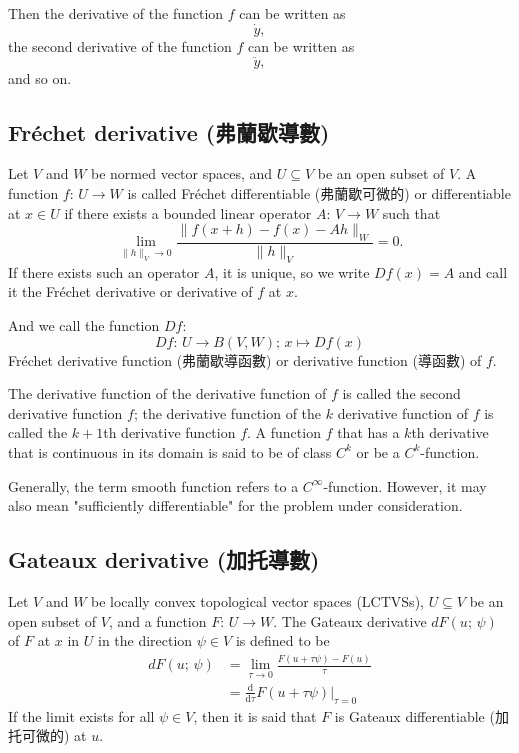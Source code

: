 \documentclass[a4paper,12pt]{report}
\begin{document}
Then the derivative of the function $f$ can be written as
\[\dot{y},\]
the second derivative of the function $f$ can be written as
\[\ddot{y},\]
and so on.
\subsection{Fréchet derivative (弗蘭歇導數)}
Let $V$ and $W$ be normed vector spaces, and $U\subseteq V$ be an open subset of $V$. A function $f:\,U\to W$ is called Fréchet differentiable (弗蘭歇可微的) or differentiable at $x\in U$ if there exists a bounded linear operator $A:\,V\to W$ such that
\[\lim_{\|h\|_V\to 0}\frac{\|f(x+h)-f(x)-Ah\|_W}{\|h\|_V}=0.\]
If there exists such an operator $A$, it is unique, so we write $Df(x)=A$ and call it the Fréchet derivative or derivative of $f$ at $x$.

And we call the function $Df$:
\[Df:\,U\to B(V,W);\,x\mapsto Df(x)\]
Fréchet derivative function (弗蘭歇導函數) or derivative function (導函數) of $f$.

The derivative function of the derivative function of $f$ is called the second derivative function $f$; the derivative function of the $k$ derivative function of $f$ is called the $k+1$th derivative function $f$.
A function $f$ that has a $k$th derivative that is continuous in its domain is said to be of class $C^k$ or be a $C^k$-function.

Generally, the term smooth function refers to a $C^{\infty}$-function. However, it may also mean "sufficiently differentiable" for the problem under consideration.
\subsection{Gateaux derivative (加托導數)}
Let $V$ and $W$ be locally convex topological vector spaces (LCTVSs), $U\subseteq V$ be an open subset of $V$, and a function $F:\,U\to W$. The Gateaux derivative $dF(u;\,\psi)$ of $F$ at $x$ in $U$ in the direction $\psi \in V$ is defined to be
\[\begin{aligned}
dF(u;\,\psi) &= \lim_{\tau\to 0}\frac{F(u+\tau \psi)-F(u)}{\tau}\\
&= \frac{\mathrm{d}}{\mathrm{d}\tau}F(u+\tau \psi)\big\vert_{\tau =0}
\end{aligned}\]
If the limit exists for all $\psi \in V$, then it is said that $F$ is Gateaux differentiable (加托可微的) at $u$.
\end{document}
